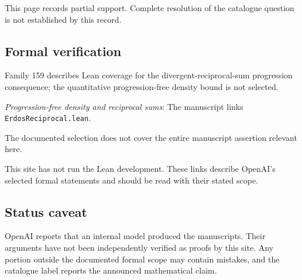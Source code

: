 \documentclass[11pt]{article}
\begin{document}
This page records partial support. Complete resolution of the catalogue question is not established by this record.

\subsection{Formal verification}
Family 159 describes Lean coverage for the divergent-reciprocal-sum progression consequence; the quantitative progression-free density bound is not selected.

\textit{Progression-free density and reciprocal sums}: The manuscript links \texttt{ErdosReciprocal.lean}.

The documented selection does not cover the entire manuscript assertion relevant here.

This site has not run the Lean development. These links describe OpenAI’s selected formal statements and should be read with their stated scope.

\subsection{Status caveat}
OpenAI reports that an internal model produced the manuscripts. Their arguments have not been independently verified as proofs by this site. Any portion outside the documented formal scope may contain mistakes, and the catalogue label reports the announced mathematical claim.
\end{document}
